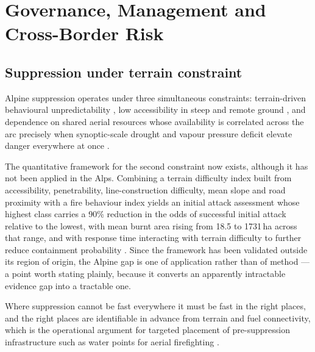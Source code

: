 \documentclass[11pt,a4paper]{article}
\begin{document}
\section{Governance, Management and Cross-Border Risk}
\label{sec:governance}

\subsection{Suppression under terrain constraint}

Alpine suppression operates under three simultaneous constraints: terrain-driven behavioural unpredictability \citep{sharples_overview_2009, melzner_brief_2019}, low accessibility in steep and remote ground \citep{muller_forest_2020}, and dependence on shared aerial resources whose availability is correlated across the arc precisely when synoptic-scale drought and vapour pressure deficit elevate danger everywhere at once \citep{miller_compounding_2025}.

The quantitative framework for the second constraint now exists, although it has not been applied in the Alps. Combining a terrain difficulty index built from accessibility, penetrability, line-construction difficulty, mean slope and road proximity with a fire behaviour index yields an initial attack assessment whose highest class carries a 90\% reduction in the odds of successful initial attack relative to the lowest, with mean burnt area rising from 18.5 to 1731\,ha across that range, and with response time interacting with terrain difficulty to further reduce containment probability \citep{cardil_assessing_2025}. Since the framework has been validated outside its region of origin, the Alpine gap is one of application rather than of method --- a point worth stating plainly, because it converts an apparently intractable evidence gap into a tractable one.

Where suppression cannot be fast everywhere it must be fast in the right places, and the right places are identifiable in advance from terrain and fuel connectivity, which is the operational argument for targeted placement of pre-suppression infrastructure such as water points for aerial firefighting \citep{conedera_linking_2024}.
\end{document}
